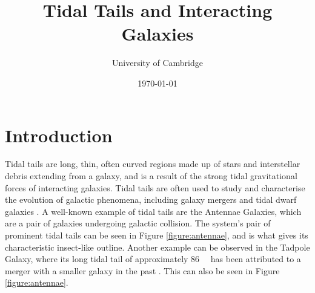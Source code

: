 \documentclass[twoside,twocolumn]{article}
\title{Tidal Tails and Interacting Galaxies} %
\author{%
    \normalsize University of Cambridge \\ %
    }
\date{
    \today \\
} %
\begin{document}
\maketitle

\section{Introduction}
    Tidal tails are long, thin, often curved regions made up of stars and interstellar debris extending from a galaxy, and is a result of the strong tidal gravitational forces of interacting galaxies. Tidal tails are often used to study and characterise the evolution of galactic phenomena, including galaxy mergers and tidal dwarf galaxies \cite{alavi}. A well-known example of tidal tails are the Antennae Galaxies, which are a pair of galaxies undergoing galactic collision. The system's pair of prominent tidal tails can be seen in Figure \ref{figure:antennae}, and is what gives its characteristic insect-like outline. Another example can be observed in the Tadpole Galaxy, where its long tidal tail of approximately \SI{86}{\kilo\parsec} has been attributed to a merger with a smaller galaxy in the past \cite{tadpole}. This can also be seen in Figure \ref{figure:antennae}.   
    
\end{document}
